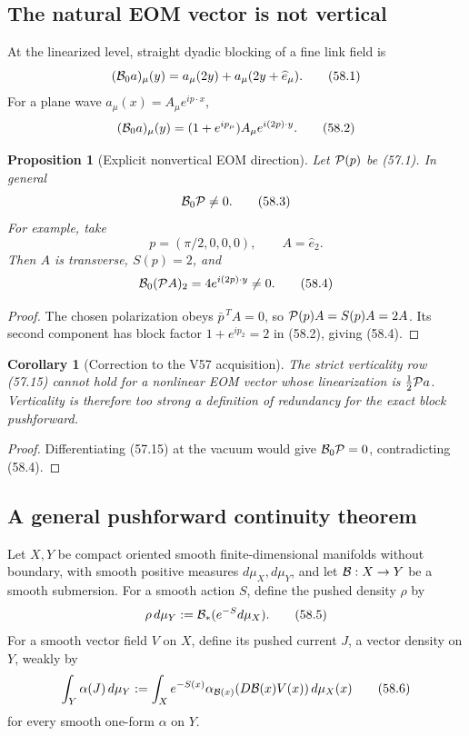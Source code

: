 \documentclass[11pt,oneside]{book}
\newtheorem{proposition}[theorem]{Proposition}
\newtheorem{corollary}[theorem]{Corollary}
\theoremstyle{definition}
\theoremstyle{remark}
\begin{document}
\subsection{The natural EOM vector is not vertical}

At the linearized level, straight dyadic blocking of a fine link
field is
\[
 ({\cal B}_0a)_\mu(y)
 =a_\mu(2y)+a_\mu(2y+\widehat e_\mu).                         \tag{58.1}
\]
For a plane wave \(a_\mu(x)=A_\mu e^{ip\cdot x}\),
\[
 ({\cal B}_0a)_\mu(y)
 =(1+e^{ip_\mu})A_\mu e^{i(2p)\cdot y}.                       \tag{58.2}
\]

\begin{proposition}[Explicit nonvertical EOM direction]
\label{prop:e8v58-EOM-not-vertical}
Let \({\cal P}(p)\) be (57.1).  In general
\[
 {\cal B}_0{\cal P}\ne0.                                     \tag{58.3}
\]
For example, take
\[
 p=(\pi/2,0,0,0),\qquad A=\widehat e_2.
\]
Then \(A\) is transverse, \(S(p)=2\), and
\[
 {\cal B}_0({\cal P}A)_2=4e^{i(2p)\cdot y}\ne0.               \tag{58.4}
\]
\end{proposition}

\begin{proof}
The chosen polarization obeys
\(\bar p^{\,T}A=0\), so \({\cal P}(p)A=S(p)A=2A\).
Its second component has block factor
\(1+e^{ip_2}=2\) in (58.2), giving (58.4).
\end{proof}

\begin{corollary}[Correction to the V57 acquisition]
\label{cor:e8v58-verticality-correction}
The strict verticality row (57.15) cannot hold for a nonlinear EOM
vector whose linearization is \(\frac12{\cal P}a\).  Verticality is
therefore too strong a definition of redundancy for the exact
block pushforward.
\end{corollary}

\begin{proof}
Differentiating (57.15) at the vacuum would give
\({\cal B}_0{\cal P}=0\), contradicting (58.4).
\end{proof}

\subsection{A general pushforward continuity theorem}

Let \(X,Y\) be compact oriented smooth finite-dimensional
manifolds without boundary, with smooth positive measures
\(d\mu_X,d\mu_Y\), and let
\({\cal B}:X\to Y\) be a smooth submersion.  For a smooth action
\(S\), define the pushed density \(\rho\) by
\[
 \rho\,d\mu_Y:={\cal B}_*(e^{-S}d\mu_X).                      \tag{58.5}
\]
For a smooth vector field \(V\) on \(X\), define its pushed current
\(J\), a vector density on \(Y\), weakly by
\[
 \int_Y\alpha(J)\,d\mu_Y
 :=\int_X e^{-S(x)}
 \alpha_{{\cal B}(x)}\!\left(D{\cal B}(x)V(x)\right)
 d\mu_X(x)                                                    \tag{58.6}
\]
for every smooth one-form \(\alpha\) on \(Y\).
\end{document}
